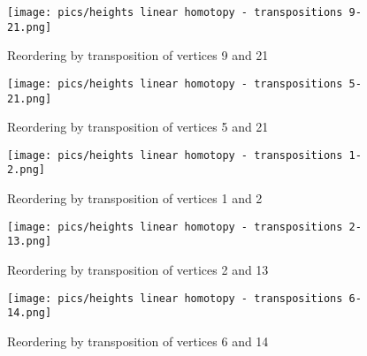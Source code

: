 \documentclass{article}
\begin{document}
\begin{figure}[htbp]
    \centering
    \texttt{[image: pics/heights linear homotopy - transpositions 9-21.png]}
    \caption{Reordering by transposition of vertices 9 and 21}
    \label{fig:transposition9and21}
\end{figure}
\begin{figure}[htbp]
    \centering
    \texttt{[image: pics/heights linear homotopy - transpositions 5-21.png]}
    \caption{Reordering by transposition of vertices 5 and 21}
    \label{fig:transposition5and21}
\end{figure}
\begin{figure}[htbp]
    \centering
    \texttt{[image: pics/heights linear homotopy - transpositions 1-2.png]}
    \caption{Reordering by transposition of vertices 1 and 2}
    \label{fig:transposition1and2}
\end{figure}
\begin{figure}[htbp]
    \centering
    \texttt{[image: pics/heights linear homotopy - transpositions 2-13.png]}
    \caption{Reordering by transposition of vertices 2 and 13}
    \label{fig:transposition2and13}
\end{figure}
\begin{figure}[htbp]
    \centering
    \texttt{[image: pics/heights linear homotopy - transpositions 6-14.png]}
    \caption{Reordering by transposition of vertices 6 and 14}
    \label{fig:transposition6and14}
\end{figure}
\end{document}
